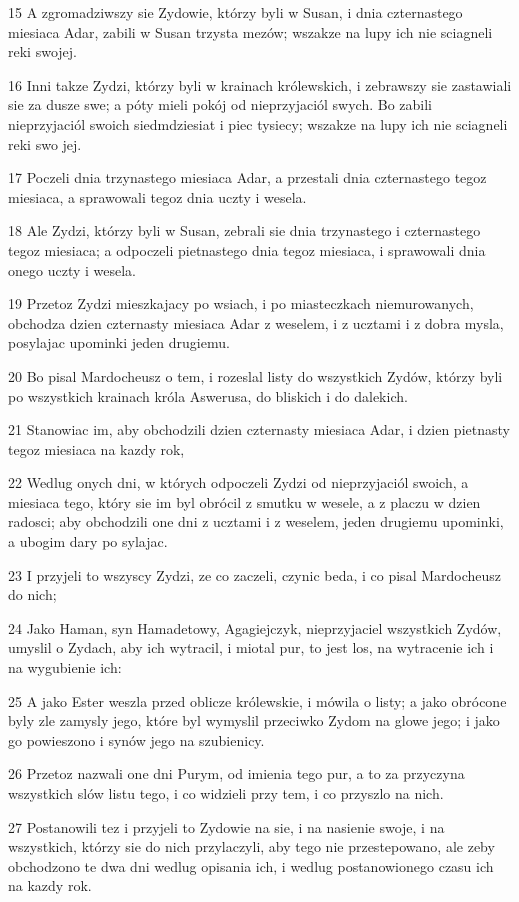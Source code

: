 \par 15 A zgromadziwszy sie Zydowie, którzy byli w Susan, i dnia czternastego miesiaca Adar, zabili w Susan trzysta mezów; wszakze na lupy ich nie sciagneli reki swojej.
\par 16 Inni takze Zydzi, którzy byli w krainach królewskich, i zebrawszy sie zastawiali sie za dusze swe; a póty mieli pokój od nieprzyjaciól swych. Bo zabili nieprzyjaciól swoich siedmdziesiat i piec tysiecy; wszakze na lupy ich nie sciagneli reki swo jej.
\par 17 Poczeli dnia trzynastego miesiaca Adar, a przestali dnia czternastego tegoz miesiaca, a sprawowali tegoz dnia uczty i wesela.
\par 18 Ale Zydzi, którzy byli w Susan, zebrali sie dnia trzynastego i czternastego tegoz miesiaca; a odpoczeli pietnastego dnia tegoz miesiaca, i sprawowali dnia onego uczty i wesela.
\par 19 Przetoz Zydzi mieszkajacy po wsiach, i po miasteczkach niemurowanych, obchodza dzien czternasty miesiaca Adar z weselem, i z ucztami i z dobra mysla, posylajac upominki jeden drugiemu.
\par 20 Bo pisal Mardocheusz o tem, i rozeslal listy do wszystkich Zydów, którzy byli po wszystkich krainach króla Aswerusa, do bliskich i do dalekich.
\par 21 Stanowiac im, aby obchodzili dzien czternasty miesiaca Adar, i dzien pietnasty tegoz miesiaca na kazdy rok,
\par 22 Wedlug onych dni, w których odpoczeli Zydzi od nieprzyjaciól swoich, a miesiaca tego, który sie im byl obrócil z smutku w wesele, a z placzu w dzien radosci; aby obchodzili one dni z ucztami i z weselem, jeden drugiemu upominki, a ubogim dary po sylajac.
\par 23 I przyjeli to wszyscy Zydzi, ze co zaczeli, czynic beda, i co pisal Mardocheusz do nich;
\par 24 Jako Haman, syn Hamadetowy, Agagiejczyk, nieprzyjaciel wszystkich Zydów, umyslil o Zydach, aby ich wytracil, i miotal pur, to jest los, na wytracenie ich i na wygubienie ich:
\par 25 A jako Ester weszla przed oblicze królewskie, i mówila o listy; a jako obrócone byly zle zamysly jego, które byl wymyslil przeciwko Zydom na glowe jego; i jako go powieszono i synów jego na szubienicy.
\par 26 Przetoz nazwali one dni Purym, od imienia tego pur, a to za przyczyna wszystkich slów listu tego, i co widzieli przy tem, i co przyszlo na nich.
\par 27 Postanowili tez i przyjeli to Zydowie na sie, i na nasienie swoje, i na wszystkich, którzy sie do nich przylaczyli, aby tego nie przestepowano, ale zeby obchodzono te dwa dni wedlug opisania ich, i wedlug postanowionego czasu ich na kazdy rok.
